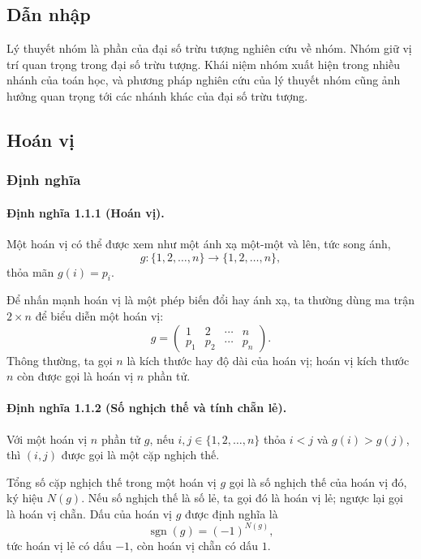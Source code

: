 \documentclass[11pt]{article}
\begin{document}
\subsection*{Dẫn nhập}

Lý thuyết nhóm là phần của đại số trừu tượng nghiên cứu về nhóm. Nhóm giữ vị
trí quan trọng trong đại số trừu tượng. Khái niệm nhóm xuất hiện trong nhiều
nhánh của toán học, và phương pháp nghiên cứu của lý thuyết nhóm cũng ảnh
hưởng quan trọng tới các nhánh khác của đại số trừu tượng.

\subsection{Hoán vị}

\subsubsection{Định nghĩa}

\paragraph{Định nghĩa 1.1.1 (Hoán vị).}
Một hoán vị có thể được xem như một ánh xạ một-một và lên, tức song ánh,
\[
  g:\{1,2,\ldots,n\}\to\{1,2,\ldots,n\},
\]
thỏa mãn \(g(i)=p_i\).

Để nhấn mạnh hoán vị là một phép biến đổi hay ánh xạ, ta thường dùng ma trận
\(2\times n\) để biểu diễn một hoán vị:
\[
  g=
  \begin{pmatrix}
    1 & 2 & \cdots & n\\
    p_1 & p_2 & \cdots & p_n
  \end{pmatrix}.
\]
Thông thường, ta gọi \(n\) là kích thước hay độ dài của hoán vị; hoán vị kích
thước \(n\) còn được gọi là hoán vị \(n\) phần tử.

\paragraph{Định nghĩa 1.1.2 (Số nghịch thế và tính chẵn lẻ).}
Với một hoán vị \(n\) phần tử \(g\), nếu \(i,j\in\{1,2,\ldots,n\}\) thỏa
\(i<j\) và \(g(i)>g(j)\), thì \((i,j)\) được gọi là một cặp nghịch thế.

Tổng số cặp nghịch thế trong một hoán vị \(g\) gọi là số nghịch thế của hoán
vị đó, ký hiệu \(N(g)\). Nếu số nghịch thế là số lẻ, ta gọi đó là hoán vị lẻ;
ngược lại gọi là hoán vị chẵn. Dấu của hoán vị \(g\) được định nghĩa là
\[
  \operatorname{sgn}(g)=(-1)^{N(g)},
\]
tức hoán vị lẻ có dấu \(-1\), còn hoán vị chẵn có dấu \(1\).
\end{document}
